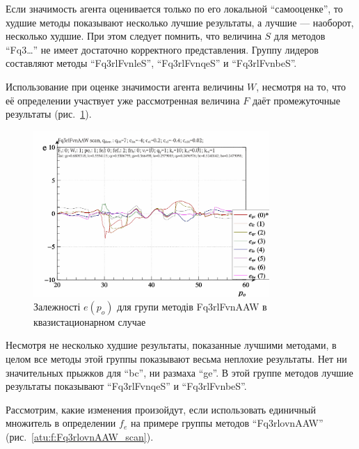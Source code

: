 Если значимость агента оценивается только по его локальной
``самооценке'', то худшие методы показывают несколько
лучшие результаты, а лучшие --- наоборот, несколько
худшие.
При этом следует помнить, что величина $S$
для методов ``Fq3\ldots'' не имеет достаточно корректного представления.
Группу лидеров составляют методы
``Fq3rlFvnleS'', ``Fq3rlFvnqeS'' и ``Fq3rlFvnbeS''.

Использование при оценке значимости агента величины $W$,
несмотря на то, что её определении участвует уже рассмотренная величина $F$
даёт промежуточные результаты (рис.~\ref{atu:f:Fq3rlFvnAAW_scan}).

\begin{figure}[htb!]
  \begin{center}
    \includegraphics[width=0.8\textwidth]{p/scan/qls-p_p_e_Fq3rlFvnAAW_scan.png}
  \end{center}
  \caption{Залежності $e(p_o)$ для групи методів Fq3rlFvnAAW в квазистационарном случае}
  \label{atu:f:Fq3rlFvnAAW_scan}
\end{figure}

Несмотря не несколько худшие результаты, показанные лучшими
методами, в целом все методы этой группы показывают
весьма неплохие результаты. Нет ни значительных прыжков для ``bc'',
ни размаха ``ge''.
В этой группе методов лучшие результаты показывают
``Fq3rlFvnqeS'' и ``Fq3rlFvnbeS''.


Рассмотрим, какие изменения произойдут, если использовать
единичный множитель в определении $f_e$ на примере группы методов ``Fq3rlovnAAW''
(рис.~\ref{atu:f:Fq3rlovnAAW_scan}).

